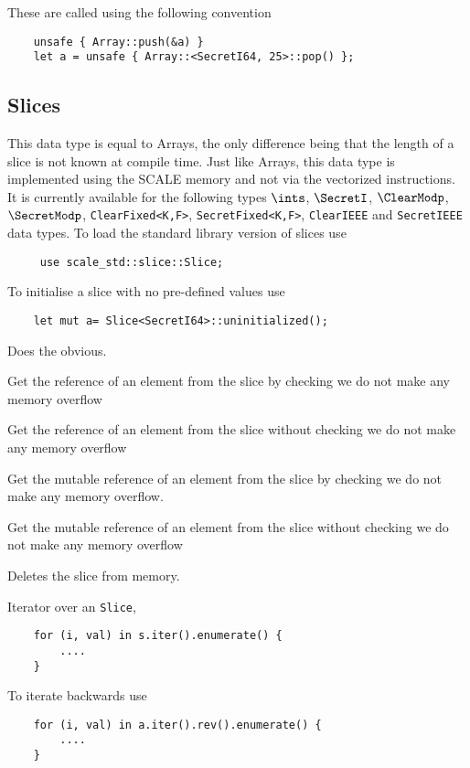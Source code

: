 These are called using the following convention
\begin{lstlisting}
    unsafe { Array::push(&a) }
    let a = unsafe { Array::<SecretI64, 25>::pop() };
\end{lstlisting}

\subsection{Slices}
\label{sec:slices}
This data type is equal to Arrays, the only difference being that the length of a slice is not known at compile time.
Just like Arrays, this data type is implemented using the SCALE memory and not
via the vectorized instructions.
It is currently available for the following types
$\ints$, $\SecretI$, $\ClearModp$, $\SecretModp$,
\verb|ClearFixed<K,F>|, \verb|SecretFixed<K,F>|,
\verb|ClearIEEE| and \verb|SecretIEEE|
data types.
To load the standard library version of slices use
\begin{lstlisting}
     use scale_std::slice::Slice;
\end{lstlisting}

To initialise a slice with no pre-defined values use
\begin{lstlisting}
    let mut a= Slice<SecretI64>::uninitialized();
\end{lstlisting}

Does the obvious.


Get the reference of an element from the slice by checking we do not make any memory overflow

Get the reference of an element from the slice without checking we do not make any memory overflow

Get the mutable reference of an element from the slice by checking we do not make any memory overflow.

Get the mutable reference of an element from the slice without checking we do not make any memory overflow

Deletes the slice from memory.


Iterator over an \verb|Slice|,
\begin{lstlisting}
    for (i, val) in s.iter().enumerate() {
        ....
    }
\end{lstlisting}
To iterate backwards use
\begin{lstlisting}
    for (i, val) in a.iter().rev().enumerate() {
        ....
    }
\end{lstlisting}

